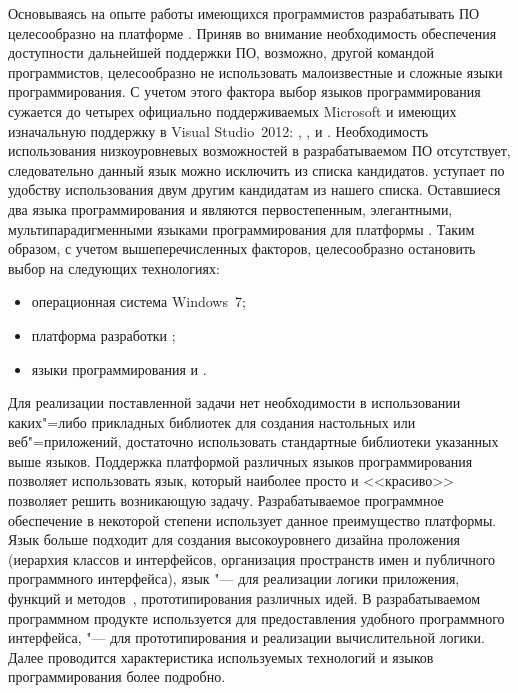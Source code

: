 Основываясь на опыте работы имеющихся программистов разрабатывать ПО целесообразно на платформе \dotnet{}.
Приняв во внимание необходимость обеспечения доступности дальнейшей поддержки ПО, возможно, другой командой программистов, целесообразно не использовать малоизвестные и сложные языки программирования.
С учетом этого фактора выбор языков программирования сужается до четырех официально поддерживаемых Microsoft и имеющих изначальную поддержку в Visual Studio~2012: \cppcli{}, \csharp{}, \vbnet{} и \fsharp{}.
Необходимость использования низкоуровневых возможностей \cppcli{} в разрабатываемом ПО отсутствует, следовательно данный язык можно исключить из списка кандидатов.
\vbnet{} уступает по удобству использования двум другим кандидатам из нашего списка.
Оставшиеся два языка программирования \csharp{} и \fsharp{} являются первостепенным, элегантными, мультипарадигменными языками программирования для платформы \dotnet.
Таким образом, с учетом вышеперечисленных факторов, целесообразно остановить выбор на следующих технологиях:
\begin{itemize}
  \item операционная система Windows~7;
  \item платформа разработки \dotnet{};
  \item языки программирования \csharp{} и \fsharp{}.
\end{itemize}
Для реализации поставленной задачи нет необходимости в использовании каких"=либо прикладных библиотек для создания настольных или веб"=приложений, достаточно использовать стандартные библиотеки указанных выше языков.
Поддержка платформой \dotnet{} различных языков программирования позволяет использовать язык, который наиболее просто и <<красиво>> позволяет решить возникающую задачу.
Разрабатываемое программное обеспечение в некоторой степени использует данное преимущество платформы.
Язык \csharp{} больше подходит для создания высокоуровнего дизайна проложения (иерархия классов и интерфейсов, организация пространств имен и публичного программного интерфейса), язык \fsharp{} "--- для реализации логики приложения, функций и методов~\cite{fsdg_2010}, прототипирования различных идей.
В разрабатываемом программном продукте \csharp{} используется для предоставления удобного программного интерфейса, \fsharp{} "--- для прототипирования и реализации вычислительной логики.
Далее проводится характеристика используемых технологий и языков программирования более подробно.



